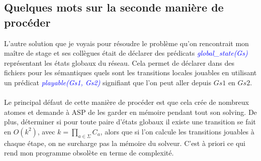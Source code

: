 \documentclass[12pt,a4paper]{article}
\begin{document}
\subsection{Quelques mots sur la seconde manière de procéder}
L'autre solution que je voyais pour résoudre le problème qu'on rencontrait mon maître de stage et ses collègues était de déclarer des prédicats \emph{\textcolor{blue}{global\_state(Gs)}} représentant les états globaux du réseau. 
Cela permet de déclarer dans des fichiers pour les sémantiques quels sont les transitions locales jouables en utilisant un prédicat \emph{\textcolor{blue}{playable(Gs1, Gs2)}} signifiant que l'on peut aller depuis 
$Gs1$ en $Gs2$.\\ \\
Le principal défaut de cette manière de procéder est que cela crée de nombreux atomes et demande à ASP de les garder en mémoire pendant tout son solving. De plus, déterminer si pour toute paire d'états globaux il existe une 
transition se fait en $O(k^2)$, avec $k=\displaystyle{\prod_{a\in\Sigma}C_a}$, alors que si l'on calcule les transitions jouables à chaque étape, on ne surcharge pas la mémoire du solveur. C'est à priori ce qui rend mon programme 
obsolète en terme de complexité.

\newpage
\end{document}
